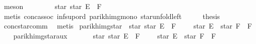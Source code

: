 \begin{isabellebody}
\ meson\isanewline
\ \ \isamarkupfalse%
\ \isamarkupfalse%
\ {\isachardoublequoteopen}{\isasymdots}\ {\isasymsubseteq}\ {\isasymPsi}\ {\isacharparenleft}{\kern0pt}star\ {\isacharparenleft}{\kern0pt}star\ E\ {\isacharat}{\kern0pt}{\isacharat}{\kern0pt}\ F{\isacharparenright}{\kern0pt}{\isacharparenright}{\kern0pt}{\isachardoublequoteclose}\isanewline
\ \ \ \ \isamarkupfalse%
\ {\isacharparenleft}{\kern0pt}metis\ conc{\isacharunderscore}{\kern0pt}assoc\ inf{\isacharunderscore}{\kern0pt}sup{\isacharunderscore}{\kern0pt}ord{\isacharparenleft}{\kern0pt}{}{\isacharparenright}{\kern0pt}\ parikh{\isacharunderscore}{\kern0pt}img{\isacharunderscore}{\kern0pt}mono\ star{\isacharunderscore}{\kern0pt}unfold{\isacharunderscore}{\kern0pt}left{\isacharparenright}{\kern0pt}\isanewline
\ \ \isamarkupfalse%
\ \isamarkupfalse%
\ {\isacharquery}{\kern0pt}thesis\ \isamarkupfalse%
\ conc{\isacharunderscore}{\kern0pt}star{\isacharunderscore}{\kern0pt}comm\ \isamarkupfalse%
\ metis\isanewline
{}\isamarkupfalse%
%
\endisatagproof
{\isafoldproof}%
%
\isadelimproof
\isanewline
%
\endisadelimproof
\isanewline
{}\isamarkupfalse%
\ parikh{\isacharunderscore}{\kern0pt}img{\isacharunderscore}{\kern0pt}star{}{\isacharcolon}{\kern0pt}\ {\isachardoublequoteopen}{\isasymPsi}\ {\isacharparenleft}{\kern0pt}star\ {\isacharparenleft}{\kern0pt}star\ E\ {\isacharat}{\kern0pt}{\isacharat}{\kern0pt}\ F{\isacharparenright}{\kern0pt}{\isacharparenright}{\kern0pt}\ {\isacharequal}{\kern0pt}\ {\isasymPsi}\ {\isacharparenleft}{\kern0pt}{\isacharbraceleft}{\kern0pt}{\isacharbrackleft}{\kern0pt}{\isacharbrackright}{\kern0pt}{\isacharbraceright}{\kern0pt}\ {\isasymunion}\ star\ E\ {\isacharat}{\kern0pt}{\isacharat}{\kern0pt}\ star\ F\ {\isacharat}{\kern0pt}{\isacharat}{\kern0pt}\ F{\isacharparenright}{\kern0pt}{\isachardoublequoteclose}\isanewline
%
\isadelimproof
%
\endisadelimproof
%
\isatagproof
{}\isamarkupfalse%
\isanewline
\ \ \isamarkupfalse%
\ parikh{\isacharunderscore}{\kern0pt}img{\isacharunderscore}{\kern0pt}star{}{\isacharunderscore}{\kern0pt}aux{}\isanewline
\ \ \ \ \isamarkupfalse%
\ {\isachardoublequoteopen}{\isasymPsi}\ {\isacharparenleft}{\kern0pt}star\ {\isacharparenleft}{\kern0pt}star\ E\ {\isacharat}{\kern0pt}{\isacharat}{\kern0pt}\ F{\isacharparenright}{\kern0pt}{\isacharparenright}{\kern0pt}\ {\isasymsubseteq}\ {\isasymPsi}\ {\isacharparenleft}{\kern0pt}{\isacharbraceleft}{\kern0pt}{\isacharbrackleft}{\kern0pt}{\isacharbrackright}{\kern0pt}{\isacharbraceright}{\kern0pt}\ {\isasymunion}\ star\ E\ {\isacharat}{\kern0pt}{\isacharat}{\kern0pt}\ star\ F\ {\isacharat}{\kern0pt}{\isacharat}{\kern0pt}\ F{\isacharparenright}{\kern0pt}{\isachardoublequoteclose}\ \isakeywordONE{{\isachardot}{\kern0pt}}\isamarkupfalse%

\end{isabellebody}
